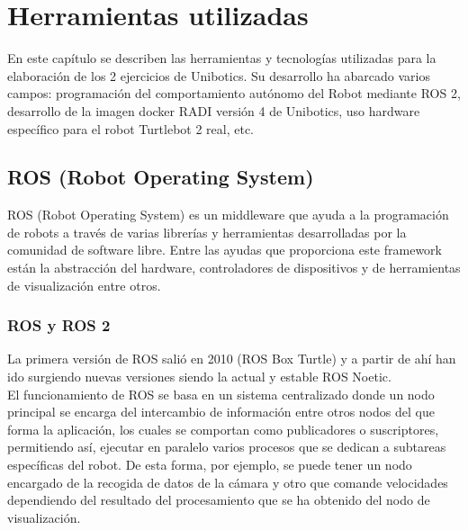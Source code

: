 \chapter{Herramientas utilizadas}
\label{cap:capitulo3}

En este capítulo se describen las herramientas y tecnologías utilizadas para la elaboración de los 2 ejercicios de Unibotics. Su desarrollo ha abarcado varios campos: programación del comportamiento autónomo del Robot mediante ROS 2, desarrollo de la imagen docker RADI versión 4 de Unibotics, uso hardware específico para el robot Turtlebot 2 real, etc.\\

\section{ROS (Robot Operating System)}
\label{sec:ros}
ROS (Robot Operating System) es un middleware que ayuda a la programación de robots a través de varias librerías y herramientas desarrolladas por la comunidad de software libre. Entre las ayudas que proporciona este framework están la abstracción del hardware, controladores de dispositivos y de herramientas de visualización entre otros.\\

\subsection {ROS y ROS 2}
\label{sec:ros_versions}
La primera versión de ROS salió en 2010 (ROS Box Turtle) y a partir de ahí han ido surgiendo nuevas versiones siendo la actual y estable ROS Noetic.\\

El funcionamiento de ROS se basa en un sistema centralizado donde un nodo principal se encarga del intercambio de información entre otros nodos del que forma la aplicación, los cuales se comportan como publicadores o suscriptores, permitiendo así, ejecutar en paralelo varios procesos que se dedican a subtareas específicas del robot. De esta forma, por ejemplo, se puede tener un nodo encargado de la recogida de datos de la cámara y otro que comande velocidades dependiendo del resultado del procesamiento que se ha obtenido del nodo de visualización.\\


